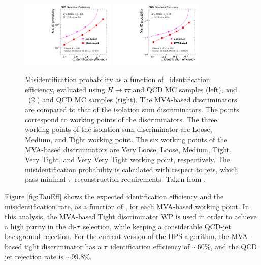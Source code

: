 \begin{figure}[ht]
  \begin{center}
    \includegraphics[width=0.4\textwidth]{figuras/Chapter3/MVAIsoPerformanceHiggs}
    \includegraphics[width=0.4\textwidth]{figuras/Chapter3/MVAIsoPerformanceZprime}
    \caption{Misidentification probability as a function of \tauh~identification 
    efficiency, evaluated using $H \rightarrow \tau\tau$ and QCD MC samples (left), and \Zprime~(2 \TeV) 
    and QCD MC samples (right). The MVA-based discriminators are compared to 
    that of the isolation sum discriminators. The points correspond to working points 
    of the discriminators. The three working points of the isolation-sum discriminator 
    are Loose, Medium, and Tight working point. The six working points of the MVA-based 
    discriminators are Very Loose, Loose, Medium, Tight, Very Tight, and Very Very
    Tight working point, respectively. The misidentification probability is calculated with respect
    to jets, which pass minimal $\tau$~reconstruction requirements. Taken from \cite{CMS-PAS-TAU-16-002}.
    }
    \label{fig:IsoPerformance}
  \end{center}
\end{figure} 

\noindent Figure \ref{fig:TauEff} shows the expected identification 
efficiency and the misidentification rate, as a function of \pt, for each 
MVA-based working point. In this analysis, the MVA-based Tight 
discriminator WP is used in order to achieve a high purity in 
the di-$\tau$~selection, while keeping a considerable 
QCD-jet background rejection. For the current 
version of the HPS algorithm, the MVA-based tight discriminator 
has a $\tau$~identification efficiency of $\sim$60$\%$, and the 
QCD jet rejection rate is  $\sim$99.8$\%$. 

